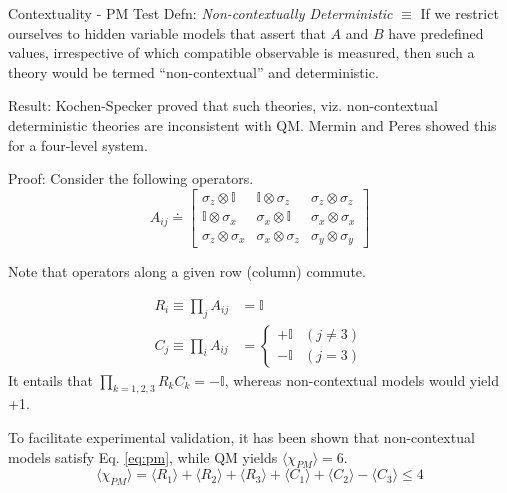 \documentclass[final,hyperref={pdfpagelabels=false}]{beamer}
\newcommand{\mean}[1]{\langle #1 \rangle}
\begin{document}
\begin{frame}[t]
\begin{columns}[c]
\begin{column}{.32\textwidth}
\begin{block}{Contextuality - PM Test}
    Defn: \emph{Non-contextually Deterministic} $\equiv$ If we restrict ourselves to hidden variable models that assert that $A$ and $B$ have predefined values, irrespective of which compatible observable is measured, then such a theory would be termed ``non-contextual'' and deterministic. 

    Result: Kochen-Specker proved that such theories, viz. non-contextual deterministic theories are inconsistent with QM. Mermin and Peres showed this for a four-level system. 

    Proof: Consider the following operators. 
    \[
    A_{ij} \doteq \left[
    \begin{array}{ccc}
       \sigma_z\otimes \mathbb I &  \mathbb I \otimes \sigma_z & \sigma_z\otimes \sigma_ z \\
       \mathbb I \otimes \sigma_x &  \sigma_x \otimes \mathbb I & \sigma_x\otimes \sigma_x \\
       \sigma_z \otimes \sigma_x &  \sigma_x \otimes \sigma_z & \sigma_y\otimes \sigma_y
    \end{array} \right]
    \]


    Note that operators along a given row (column) commute. 
    
    \begin{align}
      R_i\equiv \prod_j A_{ij} & = \mathbb{I} \\
      C_j\equiv \prod_i A_{ij} & = 
                                 \begin{cases} 
                                   +\mathbb{I} &  (j\neq 3)\\
                                   -\mathbb{I} &  (j=3)
                                 \end{cases} 
    \end{align}
It entails that $\prod_{k=1,2,3}R_kC_k= -\mathbb{I}$, whereas non-contextual models would yield +1.

To facilitate experimental validation, it has been shown that non-contextual models satisfy Eq. \ref{eq:pm}, while QM yields $\mean{\chi_{PM}}=6$.
  \begin{equation}
    \mean{\chi_{PM}} = \mean{R_1} + \mean{R_2} + \mean{R_3} + \mean{C_1} + \mean{C_2} - \mean{C_3} \le 4
    \label{eq:pm}
  \end{equation}


\end{block}
\end{column}
\end{columns}
\end{frame}
\end{document}
